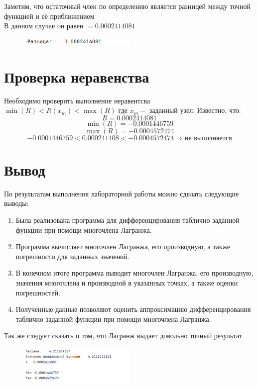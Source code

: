 \documentclass{article}
\begin{document}
Заметим, что остаточный член по определению является разницей между точной функцией
и её приближением \\ 
В данном случае он равен $= 0.0002414081$
\begin{figure}[h]
    \centering
    \includegraphics[width=0.5\textwidth]{lab_3_1.png}
    \label{fig:my_label}
\end{figure}
\section{Проверка неравенства}
Необходимо проверить выполнение неравентсва $\min(R) < R(x_m) < \max(R)$ где $x_m - $ заданный узел. 
Известно, что:
$$R = 0.0002414081$$ $$\min(R) = -0.0001446759$$ $$\max(R) = -0.0004572474$$
$$  -0.0001446759 < 0.000241408 < -0.0004572474 \Rightarrow \text{не выполняется}$$


\section{Вывод}
По результатам выполнения лабораторной работы можно сделать следующие выводы:
\begin{enumerate}
    \item Была реализована программа для дифференцирования таблично заданной функции при помощи многочлена Лагранжа.
    \item Программа вычисляет многочлен Лагранжа, его производную, а также погрешности для заданных значений.
    \item В конечном итоге программа выводит многочлен Лагранжа, его производную, значения многочлена и производной в указанных точках, а также оценки погрешностей.
    \item Полученные данные позволяют оценить аппроксимацию дифференцирования таблично заданной функции при помощи многочлена Лагранжа.
\end{enumerate}
Так же следует сказать о том, что Лагранж выдает довольно точный результат
\begin{figure}[h]
    \centering
    \includegraphics[width=0.5\textwidth]{lab_3_2.png}
    \label{fig:my_label}
\end{figure}

\thispagestyle{empty} 
\newpage
\mbox{}
\thispagestyle{empty} 
\newpage
 
\end{document}
